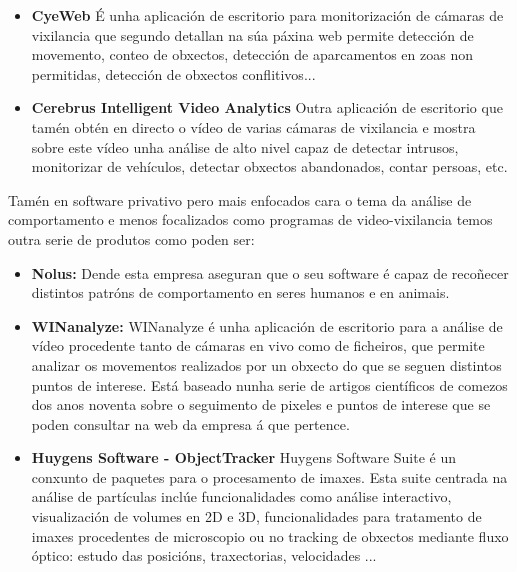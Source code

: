         \begin{itemize}
        \item \textbf{CyeWeb}\cite{CyeWeb}
            É unha aplicación de escritorio para monitorización de cámaras de vixilancia que segundo 
            detallan na súa páxina web permite detección de movemento, conteo de obxectos, detección de
            aparcamentos en zoas non permitidas, detección de obxectos conflitivos...
            
        \item \textbf{Cerebrus Intelligent Video Analytics}\cite{adventura-cerebrus-intelligent-video-analytics}
            Outra aplicación de escritorio que tamén obtén en directo o vídeo de varias cámaras de 
            vixilancia e mostra sobre este vídeo unha análise de alto nivel capaz de detectar intrusos,
            monitorizar de vehículos, detectar obxectos abandonados, contar persoas, etc.
        \end{itemize}
        
        Tamén en software privativo pero mais enfocados cara o tema da análise de comportamento e menos
        focalizados como programas de video-vixilancia temos outra serie de produtos como poden ser:
        
        \begin{itemize}
        \item  \textbf{Nolus:}\cite{nolus-human-behaviour}
            Dende esta empresa aseguran que o seu software é capaz de recoñecer distintos patróns de 
            comportamento en seres humanos e en animais.
        
        \item \textbf{WINanalyze:}\cite{WINanalyze-web-page}
            WINanalyze é unha aplicación de escritorio para a análise de vídeo procedente tanto de 
            cámaras en vivo como de ficheiros, que permite analizar os movementos realizados por un 
            obxecto do que se seguen distintos puntos de interese. Está baseado nunha serie de artigos
            científicos de comezos dos anos noventa sobre o seguimento de pixeles e puntos de interese
            que se poden consultar na web da empresa á que pertence\cite{mikromak-publications}.
        
        \item \textbf{Huygens Software - ObjectTracker}\cite{Huygens-ObjectTracker}
            Huygens Software Suite é un conxunto de paquetes para o procesamento de imaxes.
            Esta suite centrada na análise de partículas inclúe funcionalidades como análise interactivo,
            visualización de volumes en 2D e 3D, funcionalidades para tratamento de imaxes procedentes
            de microscopio ou no tracking de obxectos mediante fluxo óptico: estudo das posicións,
            traxectorias, velocidades ...
            
        \end{itemize}

